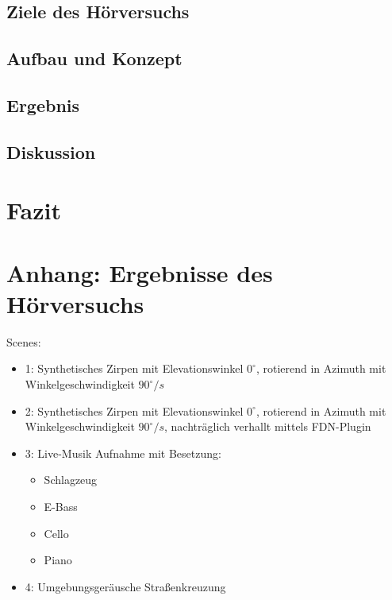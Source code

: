 \documentclass[12pt, a4paper]{article}
\begin{document}
    \subsection{Ziele des Hörversuchs}
    
    \subsection{Aufbau und Konzept}
    \label{aufbau_und_konzept}
    
    \subsection{Ergebnis}
    
    \subsection{Diskussion}
    
\newpage
\section{Fazit}

\newpage



\newpage
\appendix

\newpage

\section{Anhang: Ergebnisse des Hörversuchs}


Scenes:
\begin{itemize}
    \item 1: Synthetisches Zirpen mit Elevationswinkel $0^{\circ}$, rotierend in Azimuth mit Winkelgeschwindigkeit $90^{\circ}/s$
    \item 2: Synthetisches Zirpen mit Elevationswinkel $0^{\circ}$, rotierend in Azimuth mit Winkelgeschwindigkeit $90^{\circ}/s$, nachträglich verhallt mittels FDN-Plugin
    \item 3: Live-Musik Aufnahme mit Besetzung:
	  \begin{itemize}
	    \item Schlagzeug
	    \item E-Bass
	    \item Cello
	    \item Piano
	  \end{itemize}
    \item 4: Umgebungsgeräusche Straßenkreuzung
\end{itemize}
\end{document}
